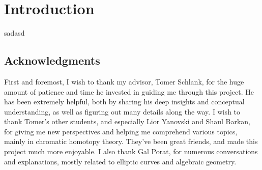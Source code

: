 \section{Introduction}

sadasd



\subsection{Acknowledgments}

First and foremost, I wish to thank my advisor, Tomer Schlank, for the huge amount of patience and time he invested in guiding me through this project.
He has been extremely helpful, both by sharing his deep insights and conceptual understanding, as well as figuring out many details along the way.
I wish to thank Tomer's other students, and especially Lior Yanovski and Shaul Barkan, for giving me new perspectives and helping me comprehend various topics, mainly in chromatic homotopy theory.
They've been great friends, and made this project much more enjoyable.
I also thank Gal Porat, for numerous conversations and explanations, mostly related to elliptic curves and algebraic geometry.